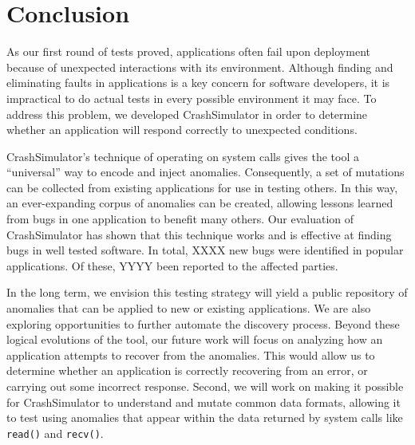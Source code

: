 \section{Conclusion}
\label{SEC:conclusion}

As our first round of tests proved,
applications often fail upon deployment because of unexpected interactions
with its environment.
Although finding and eliminating
faults in applications is a key concern for software developers, it is
impractical to do actual tests in every possible
environment it may face.
To address this problem, we developed CrashSimulator
in order to determine whether an application will
respond correctly to unexpected conditions.

CrashSimulator's
technique of
operating on system calls gives the tool a ``universal'' way to
encode and inject anomalies. Consequently, a set of mutations can be
collected from existing applications for use in testing others.
In this way, an ever-expanding corpus of anomalies can be
created, allowing lessons learned from bugs in one application to benefit
many others.
Our evaluation of CrashSimulator
has shown that this technique works and is
effective at finding bugs in well tested software.
In total,
XXXX new bugs were identified in popular applications.
Of these, YYYY been reported to the
affected parties.

In the long term, we
envision this testing strategy will yield a public repository of anomalies
that can be applied to new or existing applications.
We are also exploring
opportunities to further automate the discovery process.
Beyond these logical
evolutions of the tool, our future work
will focus on analyzing how an
application attempts
to recover from the anomalies.  This would allow
us to determine whether
an application is correctly recovering
from an error, or carrying out some incorrect response.
Second, we will work on making it possible for CrashSimulator to
understand and mutate common data formats, allowing it to test using
anomalies that appear within the data returned by system calls like {\tt
read()} and {\tt recv()}.
